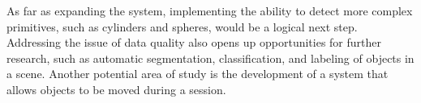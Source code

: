 As far as expanding the system, implementing the ability to detect more complex primitives,
such as cylinders and spheres, would be a logical next step.
Addressing the issue of data quality also opens up opportunities for further research, such as automatic segmentation,
classification, and labeling of objects in a scene.
Another potential area of study is the development of a system that allows objects to be moved during a session.




%
%

